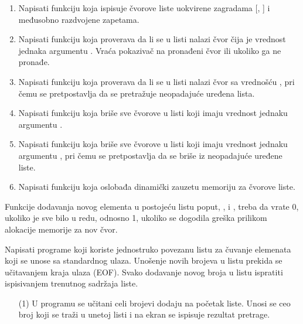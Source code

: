 \begin{Exercise}[label=601]
\begin{enumerate}
 \item Napisati funkciju  koja ispisuje čvorove liste uokvirene zagradama [, ] i međusobno razdvojene zapetama.

 \item Napisati funkciju  koja proverava da li se u listi nalazi čvor čija je vrednost jednaka argumentu . Vraća pokazivač na pronađeni čvor ili  ukoliko ga ne pronađe.

 \item Napisati funkciju  koja proverava da li se u listi nalazi čvor sa vrednošću , pri čemu se pretpostavlja da se pretražuje neopadajuće uređena lista.

 \item Napisati funkciju  koja briše sve čvorove u listi koji imaju vrednost jednaku argumentu .

 \item Napisati funkciju  koja briše sve čvorove u listi koji imaju vrednost jednaku argumentu , pri čemu se pretpostavlja da se briše iz neopadajuće uređene liste.

 \item Napisati funkciju  koja oslobađa dinamički zauzetu memoriju za čvorove liste.
 \end{enumerate}

Funkcije dodavanja novog elementa u postojeću listu poput, ,  i , 
treba da vrate 0, ukoliko je sve bilo u redu, odnosno 1, ukoliko se dogodila greška prilikom alokacije memorije za nov čvor.

Napisati programe koji koriste jednostruko povezanu listu za čuvanje elemenata koji se unose sa standardnog ulaza.  Unošenje novih brojeva u listu prekida se učitavanjem kraja ulaza (EOF). Svako dodavanje novog broja u listu ispratiti ispisivanjem trenutnog sadržaja liste. 

\begin{enumerate}
\item[(1)] U programu se učitani celi brojevi dodaju na početak liste. 
    Unosi se ceo broj koji se traži u unetoj listi i na ekran se ispisuje rezultat pretrage. 


\end{enumerate}
\end{Exercise}
